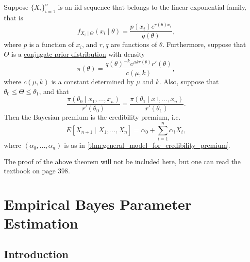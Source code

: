 \documentclass[notoc,notitlepage]{tufte-book}
\begin{document}
\begin{propo}\label{propo:exact_credibility_when_observations_belong_to_the_linear_exponential_family}
  Suppose $\{ X_i \}_{i=1}^{n}$ is an iid sequence that belongs to the linear
  exponential family, that is
  \begin{equation*}
    f_{X_i \mid \Theta}(x_i \mid \theta) = \frac{p(x_i) e^{r(\theta)
    x_i}}{q(\theta)},
  \end{equation*}
  where $p$ is a function of $x_i$, and $r, q$ are functions of $\theta$.
  Furthermore, suppose that $\Theta$ is a
  \hyperref[defn:conjugate_prior_distribution]{conjugate prior distribution}
  with density
  \begin{equation*}
    \pi(\theta) = \frac{q(\theta)^{-k} e^{\mu k r(\theta)} r'(\theta)}{c(\mu,
    k)},
  \end{equation*}
  where $c(\mu, k)$ is a constant determined by $\mu$ and $k$.
  Also, suppose that $\theta_0 \leq \Theta \leq \theta_1$, and that
  \begin{equation*}
    \frac{\pi(\theta_0 \mid x_1, \ldots, x_n)}{r'(\theta_0)}
    = \frac{\pi(\theta_1 \mid x1, \ldots, x_n)}{r'(\theta_1)}.
  \end{equation*}
  Then the Bayesian premium is the credibility premium, i.e.
  \begin{equation*}
    E[X_{n+1} \mid X_1, \ldots, X_n] = \alpha_0 + \sum_{i=1}^{n} \alpha_i X_i,
  \end{equation*}
  where $(\alpha_0, ..., \alpha_n)$ is as in
  \cref{thm:general_model_for_credibility_premium}.
\end{propo}

The proof of the above theorem will not be included here,
but one can read the textbook on page 398. \cite{klugman2012}



\chapter{Empirical Bayes Parameter Estimation}%
\label{chp:empirical_bayes_parameter_estimation}

\section{Introduction}%
\label{sec:introduction}
\end{document}
